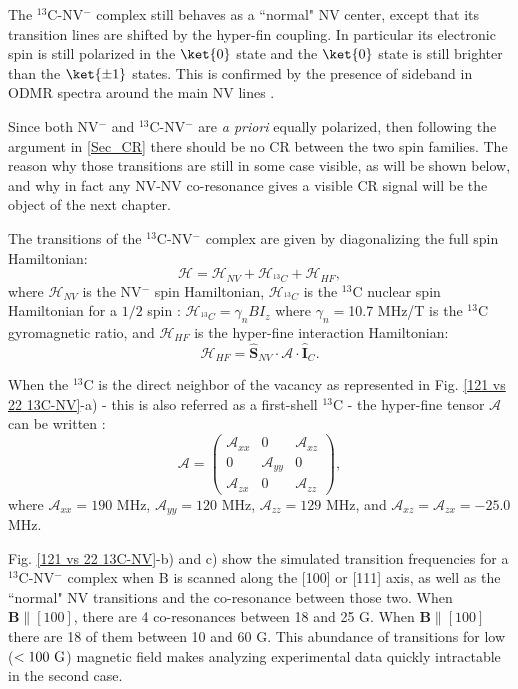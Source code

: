 \documentclass[a4paper,11pt]{report}
\begin{document}
\begin{refsection}
The $^{13}$C-NV$^-$ complex still behaves as a ``normal" NV center, except that its transition lines are shifted by the hyper-fin coupling. In particular its electronic spin is still polarized in the $\ket{0}$ state and the $\ket{0}$ state is still brighter than the $\ket{\pm 1}$ states. This is confirmed by the presence of sideband in ODMR spectra around the main NV lines \citep{simanovskaia2013sidebands}.

Since both NV$^-$ and $^{13}$C-NV$^-$ are \textit{a priori} equally polarized, then following the argument in \ref{Sec_CR} there should be no CR between the two spin families. The reason why those transitions are still in some case visible, as will be shown below, and why in fact any NV-NV co-resonance gives a visible CR signal will be the object of the next chapter.

The transitions of the $^{13}$C-NV$^-$ complex are given by diagonalizing the full spin Hamiltonian:
\begin{equation*}
\mathcal{H}=\mathcal{H}_{NV}+\mathcal{H}_{^{13}C}+\mathcal{H}_{HF},
\end{equation*}
where $\mathcal{H}_{NV}$ is the NV$^-$ spin Hamiltonian,
$\mathcal{H}_{^{13}C}$ is the $^{13}$C nuclear spin Hamiltonian for a $1/2$ spin : $\mathcal{H}_{^{13}C}=\gamma_{n} B I_z$ where $\gamma_{n}=$10.7 MHz/T is the $^{13}$C gyromagnetic ratio, and $\mathcal{H}_{HF}$ is the hyper-fine interaction Hamiltonian: $$\mathcal{H}_{HF}= \hat{\mathbf{S}}_{NV} \cdot \mathcal{A} \cdot \hat{\mathbf{I}}_C.$$

When the $^{13}$C is the direct neighbor of the vacancy as represented in Fig. \ref{121 vs 22 13C-NV}-a) - this is also referred as a first-shell $^{13}$C - the hyper-fine tensor $\mathcal{A}$ can be written \citep{simanovskaia2013sidebands}:
$$ \mathcal{A} = \begin{pmatrix}
\mathcal{A}_{xx} & 0 & \mathcal{A}_{xz} \\ 0 & \mathcal{A}_{yy} & 0 \\ \mathcal{A}_{zx} & 0 & \mathcal{A}_{zz}
\end{pmatrix},$$
where $\mathcal{A}_{xx}=190$ MHz, $\mathcal{A}_{yy}=120$ MHz, $\mathcal{A}_{zz}=129$ MHz, and  $\mathcal{A}_{xz}=\mathcal{A}_{zx}=-25.0$ MHz. 

Fig. \ref{121 vs 22 13C-NV}-b) and c) show the simulated transition frequencies for a $^{13}$C-NV$^-$ complex when B is scanned along the [100] or [111] axis, as well as the ``normal" NV transitions and the co-resonance between those two. When $\mathbf{B} \parallel [100]$, there are 4 co-resonances between 18 and 25 G. When $\mathbf{B} \parallel [100]$ there are 18 of them between 10 and 60 G. This abundance of transitions for low ($<100\ \rm G$) magnetic field makes analyzing experimental data quickly intractable in the second case.


\end{refsection}
\end{document}
